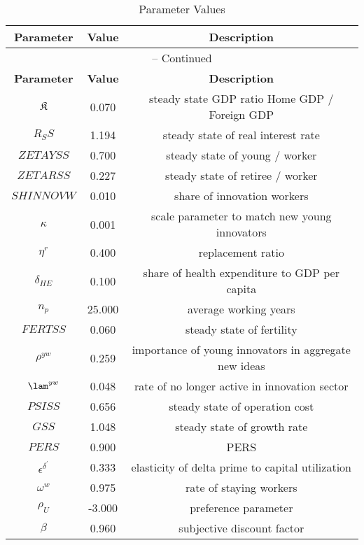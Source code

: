 \begin{center}
\begin{longtable}{ccc}
\caption{Parameter Values}\\%
\toprule%
\multicolumn{1}{c}{\textbf{Parameter}} &
\multicolumn{1}{c}{\textbf{Value}} &
 \multicolumn{1}{c}{\textbf{Description}}\\%
\midrule%
\endfirsthead
\multicolumn{3}{c}{{\tablename} \thetable{} -- Continued}\\%
\midrule%
\multicolumn{1}{c}{\textbf{Parameter}} &
\multicolumn{1}{c}{\textbf{Value}} &
  \multicolumn{1}{c}{\textbf{Description}}\\%
\midrule%
\endhead
${\mathfrak{K}}$ 	 & 	 0.070 	 & 	 steady state GDP ratio \: Home GDP / Foreign GDP \\
${R_SS}$ 	 & 	 1.194 	 & 	 steady state of real interest rate\\
${ZETAYSS}$ 	 & 	 0.700 	 & 	 steady state of young / worker \\
${ZETARSS}$ 	 & 	 0.227 	 & 	 steady state of retiree / worker \\
${SHINNOVW}$ 	 & 	 0.010 	 & 	 share of innovation workers\\
${\kappa}$ 	 & 	 0.001 	 & 	 scale parameter to match new young innovators\\
${\eta^r}$ 	 & 	 0.400 	 & 	 replacement ratio\\
${\delta_{HE}}$ 	 & 	 0.100 	 & 	 share of health expenditure to GDP per capita\\
${n_p}$ 	 & 	 25.000 	 & 	 average working years\\
${FERTSS}$ 	 & 	 0.060 	 & 	 steady state of fertility\\
${\rho^{yw}}$ 	 & 	 0.259 	 & 	 importance of young innovators in aggregate new ideas\\
${\lam^{yw}}$ 	 & 	 0.048 	 & 	 rate of no longer active in innovation sector\\
${PSISS}$ 	 & 	 0.656 	 & 	 steady state of operation cost\\
${GSS}$ 	 & 	 1.048 	 & 	 steady state of growth rate\\
$PERS$ 	 & 	 0.900 	 & 	 PERS\\
${\epsilon^{\delta^{\prime}}}$ 	 & 	 0.333 	 & 	 elasticity of delta prime to capital utilization\\
${\omega^w}$ 	 & 	 0.975 	 & 	 rate of staying workers\\
${\rho_U}$ 	 & 	 -3.000 	 & 	 preference parameter\\
${\beta}$ 	 & 	 0.960 	 & 	 subjective discount factor\\

\end{longtable}
\end{center}
